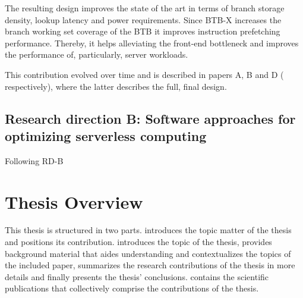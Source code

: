 \documentclass[../main.tex]{subfiles}
\begin{document}
\begin{refsection}
The resulting design improves the state of the art in terms of branch
storage density, lookup latency and power requirements. Since BTB-X
increases the branch working set coverage of the BTB it improves
instruction prefetching performance. Thereby, it helps alleviating the
front-end bottleneck and improves the performance of, particularly,
server workloads.

This contribution evolved over time and is described in papers A, B
and D (
respectively), where the latter describes the full, final design.


\subsection{Research direction B: Software approaches for optimizing serverless computing}
\label{sec:pc3}
Following RD-B 


\section{Thesis Overview}
This thesis is structured in two parts.  introduces the
topic matter of the thesis and positions its
contribution.  introduces the topic of the thesis,
 provides background material that aides
understanding and contextualizes the topics of the included paper,
 summarizes the research contributions of the
thesis in more details and finally  presents
the thesis' conclusions.  contains the scientific
publications that collectively comprise the contributions of the
thesis.

\ifx\chapincluded\undefined
  \printbibliography
  \end{refsection}
 \fi
\end{document}
